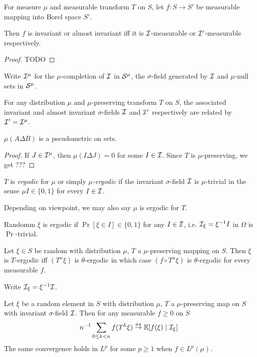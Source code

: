 \begin{lemma}
  For measure $\mu$ and measurable transform $T$ on $S$, let
  $f : S \to S'$ be measurable mapping into Borel space $S'$.

  Then $f$ is invariant or almost invariant iff 
  it is $\mathcal{I}$-measurable or $\mathcal{I}'$-measurable respectively.
\end{lemma}

\begin{proof}
  TODO
\end{proof}

Write $\mathcal{I}^\mu$ for the $\mu$-completion of $\mathcal{I}$ in $\mathcal{S}^\mu$, the
$\sigma$-field generated by $\mathcal{I}$ and $\mu$-null sets in $\mathcal{S}^\mu$.

\begin{theorem}
  For any distribution $\mu$ and $\mu$-preserving transform $T$
  on $S$, the associated invariant and almost invariant $\sigma$-fields
  $\mathcal{I}$ and $\mathcal{I}'$ respectively are related by $\mathcal{I}' = \mathcal{I}^\mu$.
\end{theorem}

$\mu(A \Delta B)$ is a pseudometric on sets.

\begin{proof}
  If $J \in \mathcal{I}^\mu$, then $\mu(I \Delta J) = 0$ for some $I \in \mathcal{I}$.
  Since $T$ is $\mu$-preserving, we get ???
\end{proof}

\begin{definition}
  $T$ is \emph{ergodic} for $\mu$ or simply \emph{$\mu$-ergodic} if the
  invariant $\sigma$-field $\mathcal{I}$ is $\mu$-trivial in the sense
  $\mu I \in \{0,1\}$ for every $I \in \mathcal{I}$.

  Depending on viewpoint, we may also say $\mu$ is ergodic for $T$.

  Randomm $\xi$ is ergodic if $\Pr[\xi \in I] \in \{0,1\}$ for any $I \in \mathcal{I}$,
  i.e. $\mathcal{I}_\xi = \xi^{-1} I$ in $\Omega$ is $\Pr$-trivial.
\end{definition}

\begin{lemma}
  Let $\xi \in S$ be random with distribution $\mu$, $T$ a $\mu$-preserving
  mapping on $S$. Then $\xi$ is $T$-ergodic iff $(T^n \xi)$ is $\theta$-ergodic
  in which case $(f \circ T^n \xi)$ is $\theta$-ergodic for every measurable
  $f$.
\end{lemma}

Write $\mathcal{I}_\xi = \xi^{-1} \mathcal{I}$.

\begin{theorem}
  Let $\xi$ be a random element in $S$ with distribution $\mu$, $T$ a
  $\mu$-preserving map on $S$ with invariant $\sigma$-field $\mathcal{I}$.
  Then for any measurable $f \geq 0$ on $S$
  \[
    n^{-1} \sum_{0 \leq k < n} f(T^k \xi) \overset{as}{\to} \mathbb{E}[f(\xi) \mid \mathcal{I}_\xi]
  \]
  The same convergence holds in $L^p$ for some $p \geq 1$ when 
  $f \in L^p(\mu)$.
\end{theorem}


